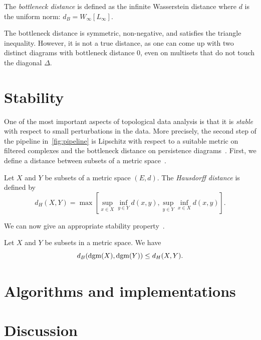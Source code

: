 \documentclass[a4paper,11pt,openany,extrafontsizes]{memoir}
\begin{document}
\begin{defn}
  The \emph{bottleneck distance} is defined as the infinite
  Wasserstein distance where $d$ is the uniform norm:
  $d_B = W_\infty[L_\infty]$.
\end{defn}

The bottleneck distance is symmetric, non-negative, and satisfies the
triangle inequality. However, it is not a true distance, as one can
come up with two distinct diagrams with bottleneck distance 0, even
on multisets that do not touch the diagonal $\Delta$.

\section{Stability}%
\label{sec:stability}

One of the most important aspects of topological data analysis is that
it is \emph{stable} with respect to small perturbations in the
data. More precisely, the second step of the pipeline
in~\autoref{fig:pipeline} is Lipschitz with respect to a suitable
metric on filtered complexes and the bottleneck distance on
persistence
diagrams~\cite{cohen-steiner_stability_2007,chazal_persistence_2014}. First,
we define a distance between subsets of a metric
space~\cite{oudot_persistence_2015}.

\begin{defn}
  Let $X$ and $Y$ be subsets of a metric space $(E, d)$. The
  \emph{Hausdorff distance} is defined by
  \[ d_H(X,Y) = \max \left[ \sup_{x\in X} \inf_{y\in Y} d(x,y),
      \sup_{y\in Y} \inf_{x\in X} d(x,y) \right]. \]
\end{defn}

We can now give an appropriate stability
property~\cite{cohen-steiner_stability_2007,chazal_persistence_2014}.

\begin{prop}
  Let $X$ and $Y$ be subsets in a metric space. We have
  \[ d_B(\operatorname{dgm}(X),\operatorname{dgm}(Y)) \leq d_H(X,Y). \]
\end{prop}

\section{Algorithms and implementations}%
\label{sec:algor-impl}

\cite{morozov_dionysus:_2018,bauer_ripser:_2018,reininghaus_dipha_2018,maria_gudhi_2014}

\section{Discussion}%
\label{sec:discussion}
\end{document}
